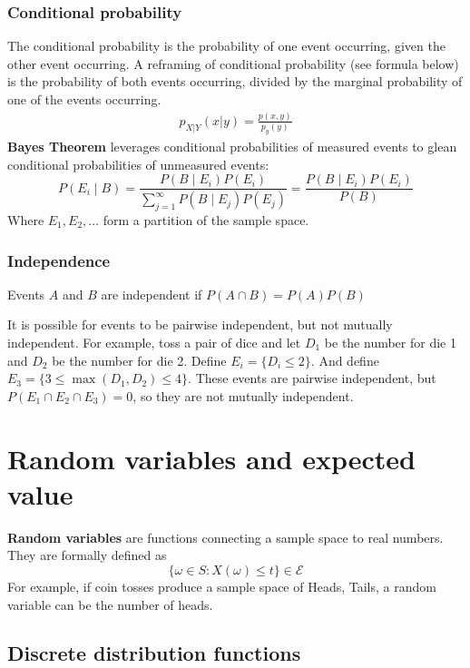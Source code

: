 \documentclass{article}
\begin{document}
\subsubsection{Conditional probability}
The conditional probability is the probability of one event occurring, given the other event occurring. A reframing of conditional probability (see formula below) is the probability of both events occurring, divided by the marginal probability of one of the events occurring. 
\begin{align*}
    p_{X|Y}(x|y) = \frac{p(x,y)}{p_y(y)}
\end{align*}
\textbf{Bayes Theorem} leverages conditional probabilities of measured events to glean conditional probabilities of unmeasured events:
\begin{equation*}
    P(E_i \mid B) = \frac{P(B \mid E_i)P(E_i)}{\sum_{j=1}^\infty P(B \mid E_j)P(E_j)} = \frac{P(B \mid E_i)P(E_i)}{P(B)}
\end{equation*}
Where $E_1, E_2, \dots$ form a partition of the sample space.

\subsubsection{Independence}
Events $A$ and $B$ are independent if $P(A\cap B) = P(A)P(B)$

It is possible for events to be pairwise independent, but not mutually independent. For example, toss a pair of dice and let $D_1$ be the number for die 1 and $D_2$ be the number for die 2. Define $E_i = \{D_i \leq 2\}$. And define $E_3 = \{ 3 \leq \max(D_1, D_2) \leq 4 \}$. These events are pairwise independent, but $P(E_1\cap E_2 \cap E_3) = 0$, so they are not mutually independent. 

\section{Random variables and expected value}
\textbf{Random variables} are functions connecting a sample space to real numbers. They are formally defined as
\begin{equation*}
    \{ \omega \in S : X(\omega) \leq t \} \in \mathcal{E}
\end{equation*}
For example, if coin tosses produce a sample space of {Heads, Tails}, a random variable can be the number of heads. 

\subsection{Discrete distribution functions}
\end{document}
